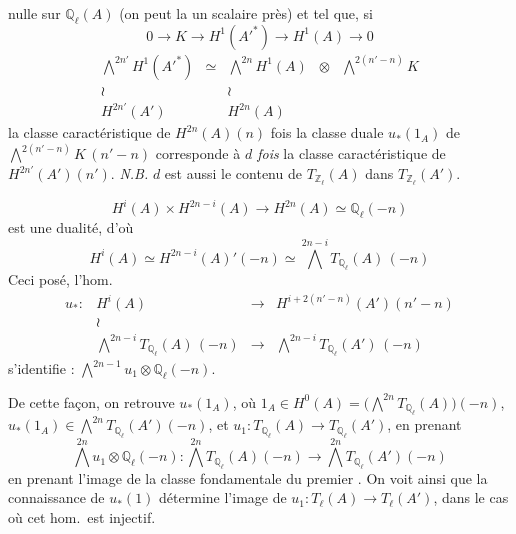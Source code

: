 \documentclass[11pt,a4paper]{article}
\begin{document}
nulle sur $\mathbb{Q}_{\ell}(A)$ (on peut la  \ill{} un
scalaire près) et tel que, si
\[
  0 \longrightarrow K \longrightarrow H^{1}(A'^{*}) \longrightarrow H^{1}(A)
  \longrightarrow 0
\]
\[
  \begin{array}{ccccc}
    \bigwedge^{2n'} H^{1}(A'^{*}) & \simeq & \bigwedge^{2n} H^{1}(A) & \otimes
    & \bigwedge^{2(n'-n)} K \\
    \wr & & \wr & & \\
    H^{2n'}(A') & & H^{2n}(A) & &
  \end{array}
\]
\ill{} la classe caractéristique de $H^{2n}(A)(n)$ fois la classe duale
$u_{*}(1_{A})$ de $\bigwedge^{2(n'-n)} K\,(n'-n)$ corresponde à \emph{$d$
fois} la classe caractéristique de $H^{2n'}(A')(n')$. \emph{N.B.} $d$ est
aussi le contenu de $T_{\mathbb{Z}_{\ell}}(A)$ dans $T_{\mathbb{Z}_{\ell}}(A')$.

\[
  H^{i}(A) \times H^{2n-i}(A) \longrightarrow H^{2n}(A) \simeq
  \mathbb{Q}_{\ell}(-n)
\]
est une dualité, d'où
\[
  H^{i}(A) \simeq H^{2n-i}(A)'(-n) \simeq \bigwedge^{2n-i}
  T_{\mathbb{Q}_{\ell}}(A)\,(-n)
\]
 Ceci posé, l'hom.\ 
\[
  \begin{array}{rccc}
    u_{*} : & H^{i}(A) & \longrightarrow & H^{i+2(n'-n)}(A')(n'-n) \\
    & \wr & & \\
    & \bigwedge^{2n-i} T_{\mathbb{Q}_{\ell}}(A)\,(-n) & \longrightarrow &
    \bigwedge^{2n-i} T_{\mathbb{Q}_{\ell}}(A')\,(-n)
  \end{array}
\]
s'identifie : $\bigwedge^{2n-1} u_{1} \otimes \mathbb{Q}_{\ell}(-n)$.

De cette façon, on retrouve $u_{*}(1_{A})$, où
$1_{A} \in H^{0}(A) = \bigl(\bigwedge^{2n} T_{\mathbb{Q}_{\ell}}(A)\bigr)(-n)$,
 $u_{*}(1_{A}) \in \bigwedge^{2n}
T_{\mathbb{Q}_{\ell}}(A')(-n)$, et
$u_{1} : T_{\mathbb{Q}_{\ell}}(A) \to T_{\mathbb{Q}_{\ell}}(A')$, en prenant
\[
  \bigwedge^{2n} u_{1} \otimes \mathbb{Q}_{\ell}(-n) : \bigwedge^{2n}
  T_{\mathbb{Q}_{\ell}}(A)(-n) \longrightarrow \bigwedge^{2n}
  T_{\mathbb{Q}_{\ell}}(A')(-n)
\]
en prenant l'image de la classe fondamentale du premier \struck{\ill{}}
\ill{}.
On voit ainsi que la connaissance de $u_{*}(1)$ détermine l'image de
$u_{1} : T_{\ell}(A) \to T_{\ell}(A')$, dans le cas où cet hom.\ est injectif.
\end{document}
